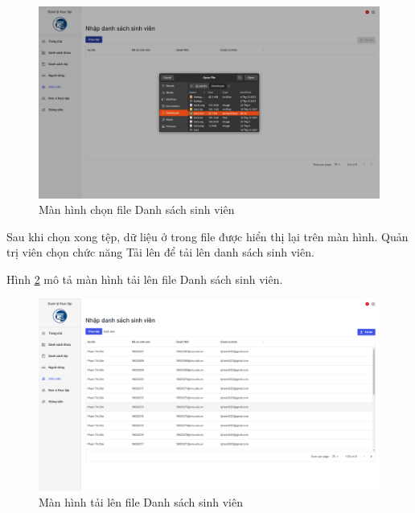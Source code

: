 \documentclass[./../main.tex]{subfiles}
\begin{document}
\begin{figure}[]
	\includegraphics[width=\linewidth]{./images/image27.png}
	\caption{Màn hình chọn file Danh sách sinh viên}
	\label{fig:choose_file}
\end{figure}

Sau khi chọn xong tệp, dữ liệu ở trong file được hiển thị lại trên màn hình. Quản trị viên chọn chức năng Tải lên để tải lên danh sách sinh viên.

Hình \ref{fig:upload_list} mô tả màn hình tải lên file Danh sách sinh viên.

\begin{figure}[]
	\includegraphics[width=\linewidth]{./images/image28.png}
	\caption{Màn hình tải lên file Danh sách sinh viên}
	\label{fig:upload_list}
\end{figure}

\end{document}
